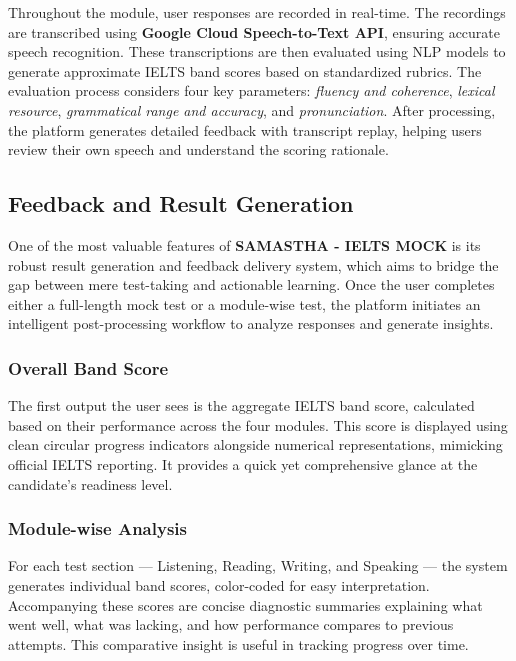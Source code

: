 \documentclass[a4paper,12pt]{article}
\begin{document}
Throughout the module, user responses are recorded in real-time. The recordings are transcribed using \textbf{Google Cloud Speech-to-Text API}, ensuring accurate speech recognition. These transcriptions are then evaluated using NLP models to generate approximate IELTS band scores based on standardized rubrics. The evaluation process considers four key parameters: \textit{fluency and coherence}, \textit{lexical resource}, \textit{grammatical range and accuracy}, and \textit{pronunciation}. After processing, the platform generates detailed feedback with transcript replay, helping users review their own speech and understand the scoring rationale.

\vspace{0.5cm}

\subsection{Feedback and Result Generation}

One of the most valuable features of \textbf{SAMASTHA - IELTS MOCK} is its robust result generation and feedback delivery system, which aims to bridge the gap between mere test-taking and actionable learning. Once the user completes either a full-length mock test or a module-wise test, the platform initiates an intelligent post-processing workflow to analyze responses and generate insights.

\vspace{0.4cm}
\subsubsection{Overall Band Score}

The first output the user sees is the aggregate IELTS band score, calculated based on their performance across the four modules. This score is displayed using clean circular progress indicators alongside numerical representations, mimicking official IELTS reporting. It provides a quick yet comprehensive glance at the candidate’s readiness level.

\vspace{0.4cm}
\subsubsection{Module-wise Analysis}

For each test section — Listening, Reading, Writing, and Speaking — the system generates individual band scores, color-coded for easy interpretation. Accompanying these scores are concise diagnostic summaries explaining what went well, what was lacking, and how performance compares to previous attempts. This comparative insight is useful in tracking progress over time.
\end{document}

